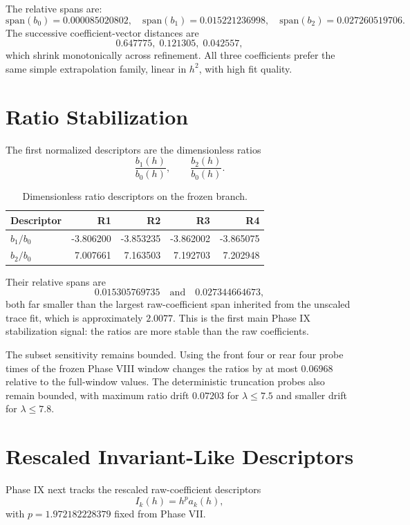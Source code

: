\documentclass[11pt]{article}
\begin{document}
The relative spans are:
\[
\mathrm{span}(b_0)=0.000085020802,\quad
\mathrm{span}(b_1)=0.015221236998,\quad
\mathrm{span}(b_2)=0.027260519706.
\]
The successive coefficient-vector distances are
\[
0.647775,\;0.121305,\;0.042557,
\]
which shrink monotonically across refinement. All three coefficients prefer the same simple extrapolation family, linear in $h^2$, with high fit quality.

\section{Ratio Stabilization}

The first normalized descriptors are the dimensionless ratios
\[
\frac{b_1(h)}{b_0(h)}, \qquad \frac{b_2(h)}{b_0(h)}.
\]

\begin{table}[t]
\centering
\small
\begin{tabular}{@{}lrrrr@{}}
\toprule
Descriptor & R1 & R2 & R3 & R4 \\
\midrule
$b_1/b_0$ & -3.806200 & -3.853235 & -3.862002 & -3.865075 \\
$b_2/b_0$ & 7.007661 & 7.163503 & 7.192703 & 7.202948 \\
\bottomrule
\end{tabular}
\caption{Dimensionless ratio descriptors on the frozen branch.}
\label{tab:ratios}
\end{table}

Their relative spans are
\[
0.015305769735 \quad \text{and} \quad 0.027344664673,
\]
both far smaller than the largest raw-coefficient span inherited from the unscaled trace fit, which is approximately $2.0077$. This is the first main Phase IX stabilization signal: the ratios are more stable than the raw coefficients.

The subset sensitivity remains bounded. Using the front four or rear four probe times of the frozen Phase VIII window changes the ratios by at most $0.06968$ relative to the full-window values. The deterministic truncation probes also remain bounded, with maximum ratio drift $0.07203$ for $\lambda \le 7.5$ and smaller drift for $\lambda \le 7.8$.

\section{Rescaled Invariant-Like Descriptors}

Phase IX next tracks the rescaled raw-coefficient descriptors
\[
I_k(h) = h^p a_k(h),
\]
with $p = 1.972182228379$ fixed from Phase VII.
\end{document}
